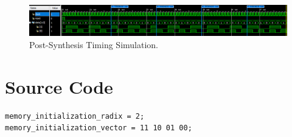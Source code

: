 \documentclass[a4paper, 12pt]{article}
\begin{document}
\begin{landscape}
\begin{figure}[H]
\centering
\includegraphics[width=0.80\paperheight, keepaspectratio=true]{Sources/Post-Synth-Sim.PNG}
\caption{Post-Synthesis Timing Simulation.}
\label{fig:post-synth-sim}
\end{figure}
\end{landscape}

\section{Source Code}
\begin{mdframed}[backgroundcolor=code-gray, roundcorner=10pt, innerleftmargin=25, innertopmargin=5, innerbottommargin=5]	

\end{mdframed}

\begin{mdframed}[backgroundcolor=code-gray, roundcorner=10pt, innerleftmargin=25, innertopmargin=5, innerbottommargin=5]	

\end{mdframed}

\begin{mdframed}[backgroundcolor=code-gray, roundcorner=10pt, innerleftmargin=25, innertopmargin=5, innerbottommargin=5]	
\begin{lstlisting}[caption=Memory Initialization File, label={lst:coe-file}]
memory_initialization_radix = 2;
memory_initialization_vector = 11 10 01 00;
\end{lstlisting}
\end{mdframed}
\end{document}
